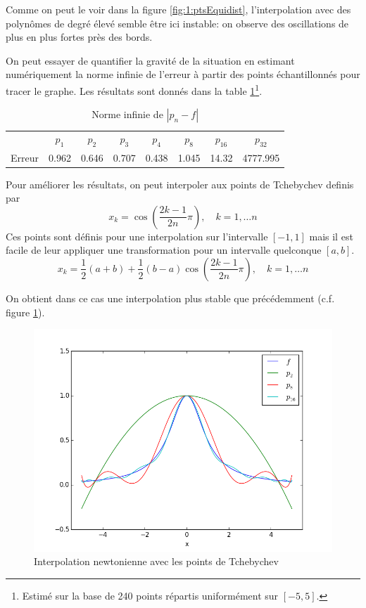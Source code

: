 Comme on peut le voir dans la figure \ref{fig:1:ptsEquidist}, 
l'interpolation avec des polynômes de degré élevé semble 
être ici instable: on observe des oscillations de plus en plus 
fortes près des bords.

On peut essayer de quantifier la gravité de la situation en 
estimant numériquement la norme infinie de l'erreur à partir 
des points échantillonnés pour tracer le graphe. Les résultats 
sont donnés dans la table \ref{table:1:erreurNormInf}\footnote{Estimé sur la base de 240 points répartis uniformément sur $[-5,5]$.}.

\begin{table}[h]
  \centering
\begin{tabular}{cccccccc}
     & $p_1$ & $p_2$ & $p_3$ & $p_4$ & $p_8$ & $p_{16}$ & $p_{32}$ \\
   Erreur & 0.962 & 0.646 & 0.707 & 0.438 & 1.045 & 14.32 & 4777.995\\
\end{tabular}
  \caption{Norme infinie de $|p_n-f|$}
  \label{table:1:erreurNormInf}
\end{table}


Pour améliorer les résultats, on peut interpoler aux points 
de Tchebychev definis par 
\[
x_k = \cos\left( \frac{2k-1}{2n} \pi \right), \quad k = 1, \dots n
\]
Ces points sont définis pour une interpolation sur l'intervalle 
$[-1, 1]$ mais il est facile de leur appliquer une transformation 
pour un intervalle quelconque $[a, b]$.
\[
x_k = \frac{1}{2}(a+b) +\frac{1}{2}(b-a)\cos\left( \frac{2k-1}{2n} \pi \right), \quad k = 1, \dots n
\]

On obtient dans ce cas une interpolation plus stable que précédemment (c.f. figure \ref{fig:1:ptsTcheby}).

\begin{figure}[h]
  \centering
  \includegraphics[scale=0.5]{fig2}
  \caption{Interpolation newtonienne avec les points de Tchebychev}
  \label{fig:1:ptsTcheby}
\end{figure}


